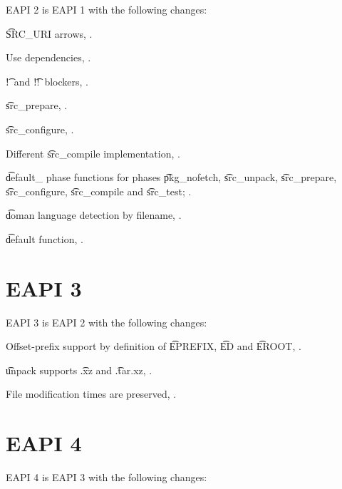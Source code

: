 EAPI 2 is EAPI 1 with the following changes:

\begin{compactitem}
\item \t{SRC_URI} arrows, .
\item Use dependencies, .
\item \t{!}\ and \t{!!}\ blockers, .
\item \t{src_prepare}, .
\item \t{src_configure}, .
\item Different \t{src_compile} implementation, .
\item \t{default_} phase functions for phases \t{pkg_nofetch}, \t{src_unpack}, \t{src_prepare},
    \t{src_configure}, \t{src_compile} and \t{src_test}; .
\item \t{doman} language detection by filename, .
\item \t{default} function, .
\end{compactitem}

\section{EAPI 3}

EAPI 3 is EAPI 2 with the following changes:
\begin{compactitem}
\item Offset-prefix support by definition of \t{EPREFIX}, \t{ED} and \t{EROOT},
    .
\item \t{unpack} supports \t{.xz} and \t{.tar.xz}, .
\item File modification times are preserved, .
\end{compactitem}

\section{EAPI 4}

EAPI 4 is EAPI 3 with the following changes:

